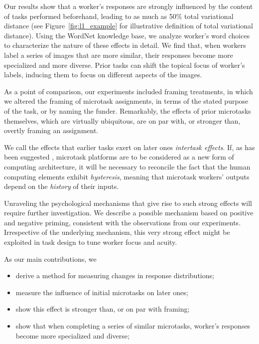 \documentclass{sigchi}
\begin{document}
Our results show that a worker's responses are strongly influenced by 
the content of tasks performed beforehand, leading to as much as 50\%
total variational distance (see Figure~\ref{fig:l1_example} for 
illustrative definition of total variational distance).  
Using the WordNet 
knowledge base, we analyze worker's word choices to characterize 
the nature of these effects in detail.  We find that, when workers 
label a series of images that are more similar, their responses become 
more specialized and more diverse.  
Prior tasks can shift the topical focus of 
worker's labels, inducing them to focus on different aspects of the images.

As a point of comparison, our experiments included framing treatments, 
in which we altered the framing of microtask assignments, in terms of the 
stated purpose of the task, or by naming the funder.
Remarkably, the effects of prior microtasks themselves,
which are virtually ubiquitous, are on par with, or stronger than, 
overtly framing an assignment.

We call the effects that earlier tasks exert on later ones 
\textit{intertask effects}.  If, as has been suggested \cite{5543192}, 
microtask platforms are to be considered as a new form of computing 
architecture, it will be necessary to reconcile the fact that the human 
computing elements exhibit \textit{hysteresis}, 
meaning that microtask workers' outputs 
depend on the \textit{history} of their inputs.

Unraveling the psychological mechanisms that give rise to such strong 
effects will require further investigation.  We describe a possible 
mechanism based on positive and negative priming, consistent with the
observations from our experiments.
Irrespective of the underlying mechanism, this very strong effect might 
be exploited in task design to tune worker focus and acuity.

As our main contributions, we
\begin{itemize}[noitemsep,nolistsep]
  \item{
	derive a method for measuring changes in response distributions;
  }
  \item{measure the influence of initial microtasks on later ones;}
  \item{show this effect is stronger than, or on par with framing;}
  \item{
	show that when completing a series of similar microtasks,
	worker's responses become more specialized and diverse;
  }
\end{itemize}
\end{document}

